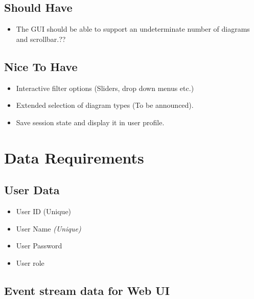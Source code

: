 \documentclass[twoside, english, draft]{Pflichtenheft}
\begin{document}
\subsection{Should Have}
\begin{itemize}
\item{The GUI should be able to support an undeterminate number of diagrams and scrollbar.??}
\end{itemize}
\subsection{Nice To Have}
\begin{itemize}
\item{Interactive filter options (Sliders, drop down menus etc.)}
\item{Extended selection of diagram types (To be announced).}
\item{Save session state and display it in user profile.}

\end{itemize}

\section{Data Requirements}
\subsection{User Data}
\begin{description}
\item{
	\begin{itemize}
		\item{User ID (Unique)}
		\item{ User Name \textit{(Unique)}}
		\item{ User Password}
		\item{ User role}
	\end{itemize}
}
\end{description}

\subsection{Event stream data for Web UI}
\end{document}
